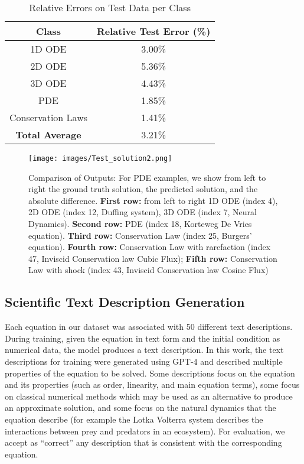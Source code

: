 \documentclass{article}
\begin{document}
\begin{table}[t]
\centering
\begin{tabular}{|c|c|}
\hline
\textbf{Class} & \textbf{Relative Test Error (\%)} \\
\hline
1D ODE & 3.00\% \\
2D ODE & 5.36\% \\
3D ODE & 4.43\% \\
PDE & 1.85\% \\
Conservation Laws & 1.41\% \\
\hline
\textbf{Total Average} & 3.21\% \\
\hline
\end{tabular}
\caption{Relative Errors on Test Data per Class}
\label{test_numeric}
\end{table}

\begin{figure}[h!]
    \centering
    \texttt{[image: images/Test\_solution2.png]}
    \caption{Comparison of Outputs: For PDE examples, we show from left to right the ground truth solution, the predicted solution, and the absolute difference. \textbf{First row:} from left to right 1D ODE (index 4), 2D ODE (index 12, Duffing system), 3D ODE (index 7, Neural Dynamics). \textbf{Second row:} PDE (index 18, Korteweg De Vries equation). \textbf{Third row:} Conservation Law (index 25, Burgers' equation). \textbf{Fourth row:} Conservation Law with rarefaction (index 47, Inviscid Conservation law Cubic Flux); \textbf{Fifth row:} Conservation Law with shock (index 43, Inviscid Conservation law Cosine Flux)}
    \label{fig:test_sol}
\end{figure}


\subsection{Scientific Text Description Generation}\label{sec:text_gen}
Each equation in our dataset was associated with 50 different text descriptions. During training, given the equation in text form and the initial condition as numerical data, the model produces a text description. In this work, the text descriptions for training were generated using GPT-4 and described multiple properties of the equation to be solved.  Some descriptions focus on the equation and its properties (such as order, linearity, and main equation terms), some focus on classical numerical methods which may be used as an alternative to produce an approximate solution, and some focus on the natural dynamics that the equation describe (for example the Lotka Volterra system describes the interactions between prey and predators in an ecosystem). For evaluation, we accept as ``correct'' any description that is consistent with the corresponding equation.
\end{document}
